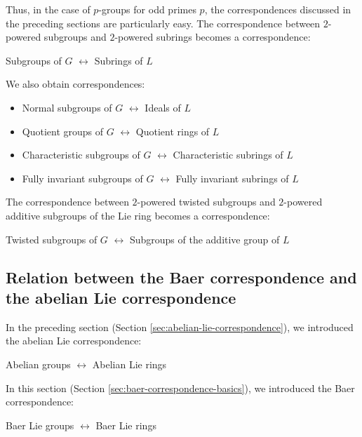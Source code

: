 \documentclass{ucetd}
\begin{document}
Thus, in the case of $p$-groups for odd primes $p$, the
correspondences discussed in the preceding sections are particularly
easy. The correspondence between $2$-powered subgroups and $2$-powered
subrings becomes a correspondence:

\begin{center}
  Subgroups of $G$ $\leftrightarrow$ Subrings of $L$
\end{center}

We also obtain correspondences:

\begin{itemize}
\item Normal subgroups of $G$ $\leftrightarrow$ Ideals of $L$
\item Quotient groups of $G$ $\leftrightarrow$ Quotient rings of $L$
\item Characteristic subgroups of $G$ $\leftrightarrow$ Characteristic
  subrings of $L$
\item Fully invariant subgroups of $G$ $\leftrightarrow$ Fully
  invariant subrings of $L$
\end{itemize}



The correspondence between $2$-powered twisted subgroups and
$2$-powered additive subgroups of the Lie ring becomes a
correspondence:

\begin{center}
  Twisted subgroups of $G$ $\leftrightarrow$ Subgroups of the additive
  group of $L$
\end{center}

\subsection{Relation between the Baer correspondence and the abelian Lie correspondence}\label{sec:baer-correspondence-abelian-lie-correspondence-relation}

In the preceding section (Section
\ref{sec:abelian-lie-correspondence}), we introduced the abelian Lie
correspondence:

\begin{center}
  Abelian groups $\leftrightarrow$ Abelian Lie rings
\end{center}

In this section (Section \ref{sec:baer-correspondence-basics}), we introduced
the Baer correspondence:

\begin{center}
  Baer Lie groups $\leftrightarrow$ Baer Lie rings
\end{center}
\end{document}
